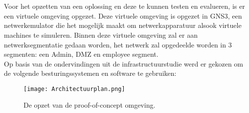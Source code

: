 \chapter{}%
\label{ch:proof-of-concept}
\section{}%
\label{sec:Gekozen-infrastructuur}

Voor het opzetten van een oplossing en deze te kunnen testen en evalueren, is er een virtuele omgeving opgezet.
Deze virtuele omgeving is opgezet in GNS3, een netwerkemulator die het mogelijk maakt om netwerkapparatuur alsook virtuele machines te simuleren.
Binnen deze virtuele omgeving zal er aan netwerksegmentatie gedaan worden, het netwerk zal opgedeelde worden in 3 segmenten: een Admin, DMZ en employee segment. \\

Op basis van de ondervindingen uit de infrastructuurstudie werd er gekozen om de volgende besturingssystemen en software te gebruiken:  

\begin{figure}
  \centering
  \texttt{[image: Architectuurplan.png]}
  \caption[Netwerkplan voor de proof-of-concept omgeving]{\label{fig:poc} De opzet van de proof-of-concept omgeving.}
\end{figure}



